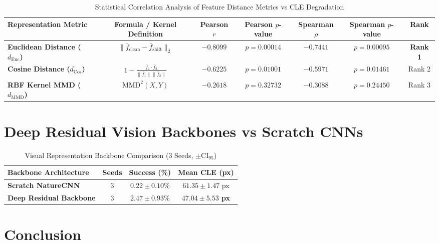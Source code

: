 \documentclass[journal]{IEEEtran}
\begin{document}
\begin{table}[t]
\centering
\caption{Statistical Correlation Analysis of Feature Distance Metrics vs CLE Degradation}
\label{tab:correlation}
\begin{tabular}{lcccccc}
\toprule
\textbf{Representation Metric} & \textbf{Formula / Kernel Definition} & \textbf{Pearson $r$} & \textbf{Pearson $p$-value} & \textbf{Spearman $\rho$} & \textbf{Spearman $p$-value} & \textbf{Rank} \\
\midrule
\textbf{Euclidean Distance ($d_{\text{Euc}}$)} & $\|\bar{f}_{\text{clean}} - \bar{f}_{\text{shift}}\|_2$ & \textbf{$-0.8099$} & \textbf{$p = 0.00014$} & \textbf{$-0.7441$} & \textbf{$p = 0.00095$} & \textbf{Rank 1} \\
\textbf{Cosine Distance ($d_{\text{Cos}}$)} & $1 - \frac{\bar{f}_1 \cdot \bar{f}_2}{\|\bar{f}_1\| \|\bar{f}_2\|}$ & $-0.6225$ & $p = 0.01001$ & $-0.5971$ & $p = 0.01461$ & Rank 2 \\
\textbf{RBF Kernel MMD ($d_{\text{MMD}}$)} & $\text{MMD}^2(X, Y)$ & $-0.2618$ & $p = 0.32732$ & $-0.3088$ & $p = 0.24450$ & Rank 3 \\
\bottomrule
\end{tabular}
\end{table}

\section{Deep Residual Vision Backbones vs Scratch CNNs}

\begin{table}[t]
\centering
\caption{Visual Representation Backbone Comparison (3 Seeds, $\pm \text{CI}_{95}$)}
\label{tab:backbone}
\begin{tabular}{lccc}
\toprule
\textbf{Backbone Architecture} & \textbf{Seeds} & \textbf{Success (\%)} & \textbf{Mean CLE (px)} \\
\midrule
\textbf{Scratch NatureCNN} & 3 & $0.22 \pm 0.10\%$ & $61.35 \pm 1.47$ px \\
\textbf{Deep Residual Backbone} & 3 & \textbf{$2.47 \pm 0.93\%$} & \textbf{$47.04 \pm 5.53$ px} \\
\bottomrule
\end{tabular}
\end{table}

\section{Conclusion}
\end{document}
